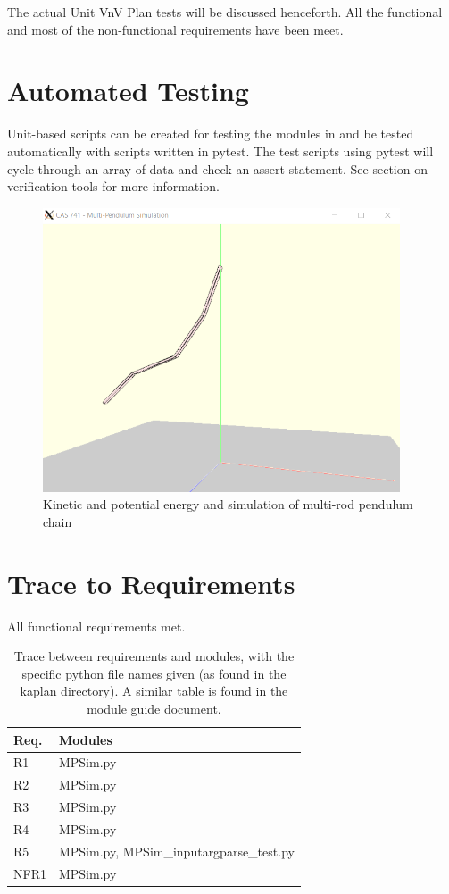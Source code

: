 \documentclass[12pt, titlepage]{article}
\begin{document}
The actual Unit VnV Plan tests will be discussed henceforth. All 
the functional and most of the non-functional requirements have been meet.

\section{Automated Testing}

Unit-based scripts can be created for testing the modules in \progname{}and be tested automatically with 
scripts written in pytest. The test scripts using pytest will cycle through an array of data and check an assert 
statement. See section on verification tools for more information.

\begin{figure}[H]
	\centering
	\includegraphics[width=400px]{MPSim.PNG}
	\caption{Kinetic and potential energy and simulation
	of multi-rod pendulum chain~\citep{WikipediaPendulum}}
	\label{fig:PE-pend}
\end{figure}
		
\section{Trace to Requirements}

All functional requirements met.
\begin{table}[H]
	\centering
	\begin{tabular}{p{} p{}}
		\toprule
		\textbf{Req.} & \textbf{Modules}\\
		\midrule
		R1 & MPSim.py  \\
		R2 & MPSim.py  \\
		R3 & MPSim.py  \\
		R4 & MPSim.py  \\
		R5 & MPSim.py, MPSim\_inputargparse\_test.py \\
		NFR1 & MPSim.py \\
		\bottomrule
	\end{tabular}
	\caption{Trace between requirements and modules, with the specific python 
	file names given (as found in the kaplan directory). A similar table is 
	found in the module guide document.}
	\label{trace-RM}
\end{table}	
		
\end{document}
